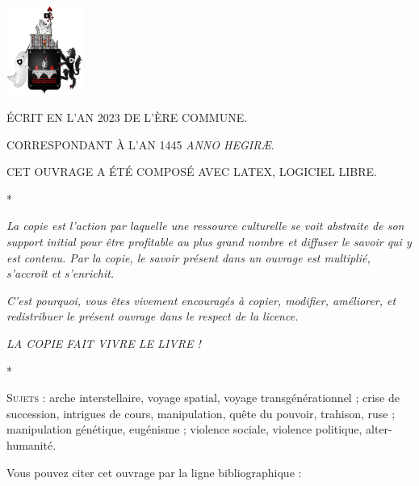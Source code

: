 \documentclass[a4paper,12pt,twoside,french]{book}
\begin{document}
    \begin{center}
    \null\vfill

      \footnotesize



      \vspace{-10em}
      \includegraphics[width=2.5cm]{ecu-fauve.pdf}


      \vspace{4em}


      \MakeUppercase{Écrit en l’an 2023 de l’Ère commune.}

      \MakeUppercase{Correspondant à l’an 1445 \emph{Anno Hegiræ}.}

      \MakeUppercase{Cet ouvrage a été composé avec \LaTeX, logiciel libre.}

      \vspace{1em}
      *

      \emph{La copie est l’action par laquelle une ressource culturelle se voit abstraite de son support initial pour être profitable au plus grand nombre et diffuser le savoir qui y est contenu. Par la copie, le savoir présent dans un ouvrage est multiplié, s’accroît et s’enrichit.}

      \emph{C’est pourquoi, vous êtes vivement encouragés à copier, modifier, améliorer, et redistribuer le présent ouvrage dans le respect de la licence.}

      \emph{{\uppercase{La copie fait vivre le livre !}}}


      \vspace{1em}
      *

      \textsc{Sujets :} arche interstellaire, voyage spatial, voyage transgénérationnel  ; crise de succession, intrigues de cours, manipulation, quête du pouvoir, trahison, ruse ; manipulation génétique, eugénisme ; violence sociale, violence politique, alter-humanité.

      \vspace{1em}

      Vous pouvez citer cet ouvrage par la ligne bibliographique :


\end{center}
\end{document}
